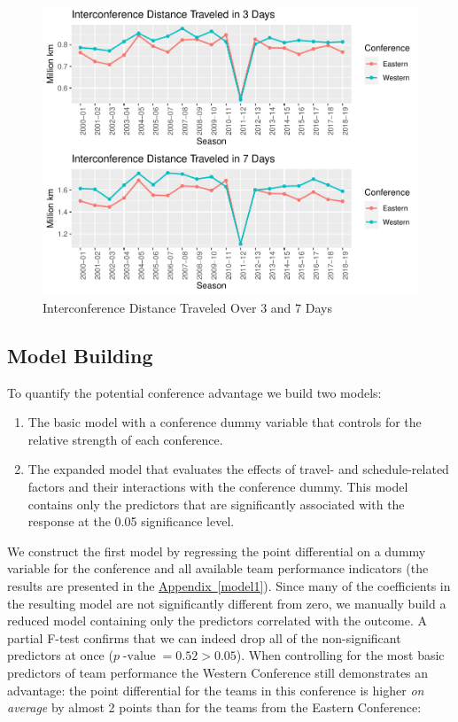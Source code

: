 \documentclass[
    12pt,
    a4paper,
    titlepage,  %
    abstract,  %
    headings=standardclasses,  %
    bibliography=totocnumbered  %
]{scrartcl}
\begin{document}
\begin{figure}[ht]
    \centering
    \includegraphics[width=\linewidth]{dist-ic-days}
    \caption{Interconference Distance Traveled Over 3 and 7 Days}
    \label{fig:dist-ic-days}
\end{figure}

\subsection{Model Building}

To quantify the potential conference advantage we build two models:

\begin{enumerate}
    \item The basic model with a conference dummy variable that controls for the relative strength of each conference.
    \item The expanded model that evaluates the effects of travel- and schedule-related factors and their interactions with the conference dummy. This model contains only the predictors that are significantly associated with the response at the 0.05 significance level.
\end{enumerate}

We construct the first model by regressing the point differential on a dummy variable for the conference and all available team performance indicators (the results are presented in the \hyperref[model1]{Appendix~\ref*{model1}}). Since many of the coefficients in the resulting model are not significantly different from zero, we manually build a reduced model containing only the predictors correlated with the outcome. A partial F-test confirms that we can indeed drop all of the non-significant predictors at once ($p\operatorname{-value} = 0.52 > 0.05$). When controlling for the most basic predictors of team performance the Western Conference still demonstrates an advantage: the point differential for the teams in this conference is higher \emph{on average} by almost 2 points than for the teams from the Eastern Conference:
\end{document}
